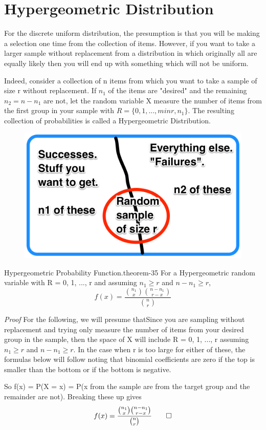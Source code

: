 \documentclass[10pt,]{book}
\makeatletter
\renewcommand*{\proofname}{Proof}
\renewenvironment{proof}[1][\proofname]{\par
  \pushQED{\qed}%
  \normalfont \topsep6\p@\@plus6\p@\relax
  \trivlist
  \item\relax
    {\itshape
    #1\@addpunct{.}}\hspace\labelsep\ignorespaces
}{%
  \popQED\endtrivlist\@endpefalse
}
\numberwithin{equation}{section}
\makeatother
\begin{document}
\section[{Hypergeometric Distribution}]{Hypergeometric Distribution}\label{section-42}
\hypertarget{p-835}{}%
For the discrete uniform distribution, the presumption is that you will be making a selection one time from the collection of items. However, if you want to take a larger sample without replacement from a distribution in which originally all are equally likely then you will end up with something which will not be uniform.%
\par
\hypertarget{p-836}{}%
Indeed, consider a collection of n items from which you want to take a sample of size r without replacement. If \(n_1\) of the items are "desired" and the remaining \(n_2 = n - n_1\) are not, let the random variable X measure the number of items from the first group in your sample with \(R = \{0, 1, ..., min {r,n_1} \}\). The resulting collection of probabilities is called a Hypergeometric Distribution.%
\par
\hypertarget{p-837}{}%
\begin{figure}\centering\includegraphics[width=0.6\linewidth]{images/HypergeometricBucket.png}
\end{figure}%
\par
\hypertarget{p-838}{}%
\begin{theorem}{Hypergeometric Probability Function.}{}{theorem-35}%
\hypertarget{HypergeometricFunction}{}%
For a Hypergeometric random variable with R = {0, 1, ..., r} and assuming \(n_1 \ge r\) and \(n-n_1 \ge r\),%
\begin{equation*}
f(x) = \frac{\binom{n_1}{x} \binom{n-n_1}{r-x}}{\binom{n}{r}}
\end{equation*}
%
\end{theorem}
\begin{proof}\hypertarget{proof-38}{}
\hypertarget{p-840}{}%
For the following, we will presume thatSince you are sampling without replacement and trying only measure the number of items from your desired group in the sample, then the space of X will include R = {0, 1, ..., r} assuming \(n_1 \ge r\) and \(n-n_1 \ge r\). In the case when r is too large for either of these, the formulas below will follow noting that binomial coefficients are zero if the top is smaller than the bottom or if the bottom is negative.%
\par
\hypertarget{p-841}{}%
So f(x) = P(X = x) = P(x from the sample are from the target group and the remainder are not). Breaking these up gives%
\begin{equation*}
f(x) = \frac{\binom{n_1}{x} \binom{n-n_1}{r-x}}{\binom{n}{r}}\qedhere
\end{equation*}
%
\end{proof}
\end{document}
